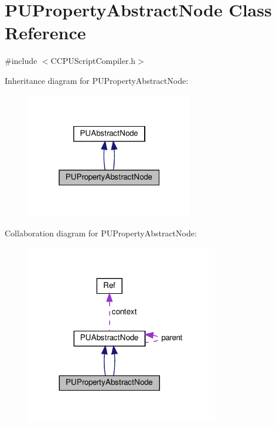 \hypertarget{classPUPropertyAbstractNode}{}\section{P\+U\+Property\+Abstract\+Node Class Reference}
\label{classPUPropertyAbstractNode}


{\ttfamily \#include $<$C\+C\+P\+U\+Script\+Compiler.\+h$>$}



Inheritance diagram for P\+U\+Property\+Abstract\+Node\+:
\nopagebreak
\begin{figure}[H]
\begin{center}
\leavevmode
\includegraphics[width=208pt]{classPUPropertyAbstractNode__inherit__graph}
\end{center}
\end{figure}


Collaboration diagram for P\+U\+Property\+Abstract\+Node\+:
\nopagebreak
\begin{figure}[H]
\begin{center}
\leavevmode
\includegraphics[width=239pt]{classPUPropertyAbstractNode__coll__graph}
\end{center}
\end{figure}
